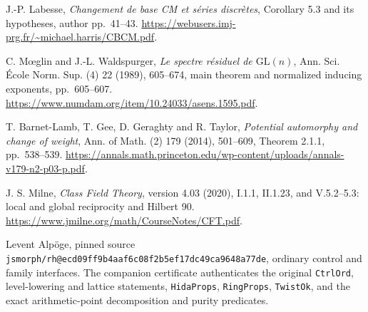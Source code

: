 J.-P. Labesse, \emph{Changement de base CM et s\'eries discr\`etes},
Corollary 5.3 and its hypotheses, author pp.~41--43.
\url{https://webusers.imj-prg.fr/~michael.harris/CBCM.pdf}.

C. M\oe glin and J.-L. Waldspurger,
\emph{Le spectre r\'esiduel de $\mathrm{GL}(n)$},
Ann. Sci. \'Ecole Norm. Sup. (4) 22 (1989), 605--674,
main theorem and normalized inducing exponents, pp.~605--607.
\url{https://www.numdam.org/item/10.24033/asens.1595.pdf}.

T. Barnet-Lamb, T. Gee, D. Geraghty and R. Taylor,
\emph{Potential automorphy and change of weight},
Ann. of Math. (2) 179 (2014), 501--609,
Theorem 2.1.1, pp.~538--539.
\url{https://annals.math.princeton.edu/wp-content/uploads/annals-v179-n2-p03-p.pdf}.

J. S. Milne, \emph{Class Field Theory}, version 4.03 (2020),
I.1.1, II.1.23, and V.5.2--5.3: local and global reciprocity and Hilbert 90.
\url{https://www.jmilne.org/math/CourseNotes/CFT.pdf}.

Levent Alp\"oge, pinned source
\texttt{jsmorph/rh@ecd09ff9b4aaf6c08f2b5ef17dc49ca9648a77de},
ordinary control and family interfaces.
The companion certificate authenticates the original
\texttt{CtrlOrd}, level-lowering and lattice statements,
\texttt{HidaProps}, \texttt{RingProps}, \texttt{TwistOk},
and the exact arithmetic-point decomposition and purity predicates.

